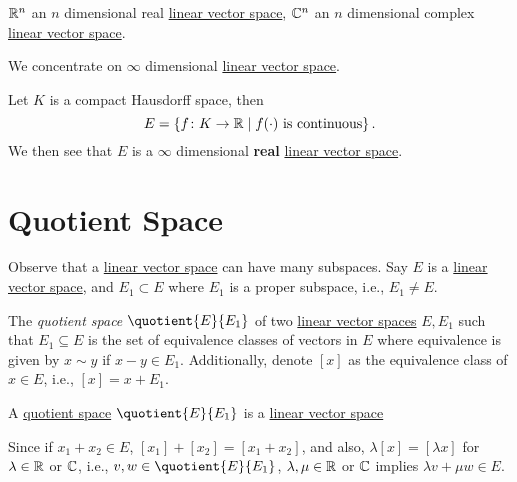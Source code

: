 \begin{eg}
	\(\mathbb{\MakeUppercase{r}} ^n\) an \(n\) dimensional real \hyperref[def:linear-vector-space]{linear vector space}, \(\mathbb{\MakeUppercase{c}} ^n\) an \(n\) dimensional complex \hyperref[def:linear-vector-space]{linear vector space}.
\end{eg}

We concentrate on \(\infty \) dimensional \hyperref[def:linear-vector-space]{linear vector space}.

\begin{eg}
	Let \(K\) is a compact Hausdorff space, then
	\[
		E = \left\{ f\colon K\to \mathbb{\MakeUppercase{r}} \mid f(\cdot) \text{ is continuous}  \right\}.
	\]
	We then see that \(E\) is a \(\infty\) dimensional \textbf{real} \hyperref[def:linear-vector-space]{linear vector space}.
\end{eg}

\section{Quotient Space}
Observe that a \hyperref[def:linear-vector-space]{linear vector space} can have many subspaces. Say \(E\) is a \hyperref[def:linear-vector-space]{linear vector space}, and \(E_1 \subset E\) where \(E_1\) is a proper subspace, i.e., \(E_1 \neq E\).

\begin{definition}\label{def:quotient-space}
	The \emph{quotient space} \(\quotient{E}{E_1} \) of two \hyperref[def:linear-vector-space]{linear vector spaces} \(E, E_1\) such that \(E_1 \subseteq E\) is the set of equivalence classes of vectors in \(E\) where equivalence is given by \(x\sim y\) if \(x - y\in E_1\). Additionally, denote \([x]\) as the equivalence class of \(x\in E\), i.e., \([x] = x + E_1\).
\end{definition}

\begin{remark}
	A \hyperref[def:quotient-space]{quotient space} \(\quotient{E}{E_1} \) is a \hyperref[def:linear-vector-space]{linear vector space}
\end{remark}
\begin{explanation}
	Since if \(x_1 + x_2\in E\), \([x_1] + [x_2] = [x_1 + x_2]\), and also, \(\lambda [x] = [\lambda x]\) for \(\lambda \in \mathbb{\MakeUppercase{r}} \) or \(\mathbb{\MakeUppercase{c}} \), i.e., \(v, w\in \quotient{E}{E_1} \), \(\lambda , \mu \in\mathbb{\MakeUppercase{r}} \) or \(\mathbb{\MakeUppercase{c}} \) implies \(\lambda v + \mu w\in E\).
\end{explanation}

